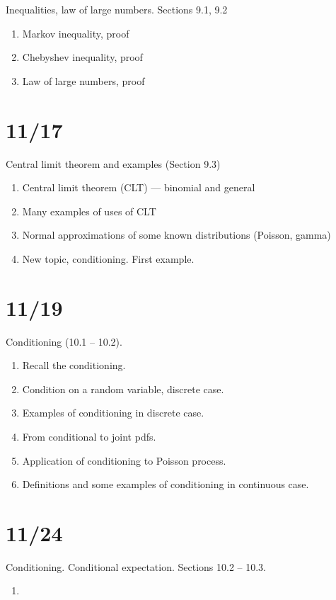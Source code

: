 \documentclass[letterpaper,11pt,oneside,reqno]{amsart}
\numberwithin{equation}{section}
\theoremstyle{definition}
\begin{document}
Inequalities, law of large numbers. Sections 9.1, 9.2
\begin{enumerate}
	\item Markov inequality, proof
	\item Chebyshev inequality, proof
	\item Law of large numbers, proof
\end{enumerate}

\section{11/17}

Central limit theorem and examples (Section 9.3)
\begin{enumerate}
	\item Central limit theorem (CLT) --- binomial and general
	\item Many examples of uses of CLT
	\item Normal approximations of some known distributions (Poisson, gamma)
	\item New topic, conditioning. First example.
\end{enumerate}

\section{11/19}

Conditioning (10.1 -- 10.2).
\begin{enumerate}
	\item Recall the conditioning.
	\item Condition on a random variable, discrete case.
	\item Examples of conditioning in discrete case.
	\item From conditional to joint pdfs.
	\item Application of conditioning to Poisson process.
	\item Definitions and some examples of conditioning in continuous case.
\end{enumerate}

\section{11/24}

Conditioning. Conditional expectation. Sections 10.2 -- 10.3.
\begin{enumerate}
	\item 
\end{enumerate}
\end{document}

